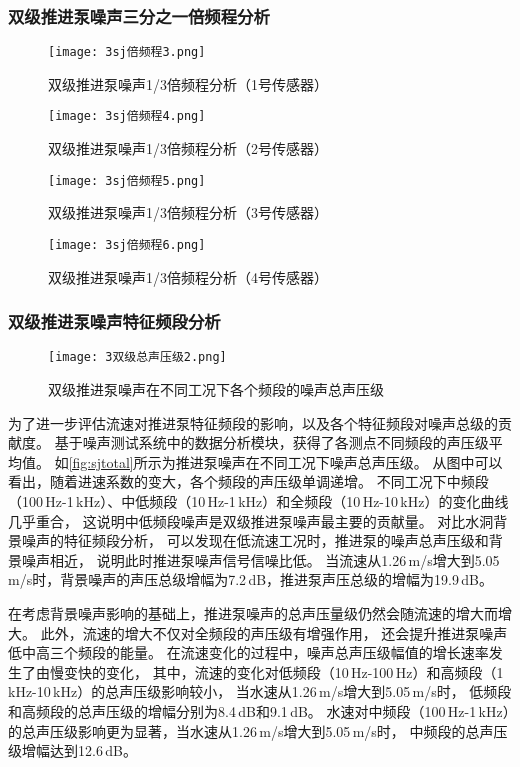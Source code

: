 \subsubsection{双级推进泵噪声三分之一倍频程分析}
\begin{figure}[htbp]
    \centering
    \texttt{[image: 3sj倍频程3.png]}
    \caption{\label{fig:sjotc1}双级推进泵噪声1/3倍频程分析（1号传感器）}
\end{figure}
\begin{figure}[htbp]
    \centering
    \texttt{[image: 3sj倍频程4.png]}
    \caption{\label{fig:sjotc2}双级推进泵噪声1/3倍频程分析（2号传感器）}
\end{figure}
\begin{figure}[htbp]
    \centering
    \texttt{[image: 3sj倍频程5.png]}
    \caption{\label{fig:sjotc3}双级推进泵噪声1/3倍频程分析（3号传感器）}
\end{figure}
\begin{figure}[htbp]
    \centering
    \texttt{[image: 3sj倍频程6.png]}
    \caption{\label{fig:sjotc4}双级推进泵噪声1/3倍频程分析（4号传感器）}
\end{figure}
\subsubsection{双级推进泵噪声特征频段分析}
\begin{figure}[htbp]
    \centering
    \texttt{[image: 3双级总声压级2.png]}
    \caption{\label{fig:sjtotal}双级推进泵噪声在不同工况下各个频段的噪声总声压级}
\end{figure}

为了进一步评估流速对推进泵特征频段的影响，以及各个特征频段对噪声总级的贡献度。
基于噪声测试系统中的数据分析模块，获得了各测点不同频段的声压级平均值。
如\autoref{fig:sjtotal}所示为推进泵噪声在不同工况下噪声总声压级。
从图中可以看出，随着进速系数的变大，各个频段的声压级单调递增。
不同工况下中频段（100\,Hz-1\,kHz）、中低频段（10\,Hz-1\,kHz）和全频段（10\,Hz-10\,kHz）的变化曲线几乎重合，
这说明中低频段噪声是双级推进泵噪声最主要的贡献量。
对比水洞背景噪声的特征频段分析，
可以发现在低流速工况时，推进泵的噪声总声压级和背景噪声相近，
说明此时推进泵噪声信号信噪比低。
当流速从1.26\,m/s增大到5.05\,m/s时，背景噪声的声压总级增幅为7.2\,dB，推进泵声压总级的增幅为19.9\,dB。

在考虑背景噪声影响的基础上，推进泵噪声的总声压量级仍然会随流速的增大而增大。
此外，流速的增大不仅对全频段的声压级有增强作用，
还会提升推进泵噪声低中高三个频段的能量。
在流速变化的过程中，噪声总声压级幅值的增长速率发生了由慢变快的变化，
其中，流速的变化对低频段（10\,Hz-100\,Hz）和高频段（1\,kHz-10\,kHz）的总声压级影响较小，
当水速从1.26\,m/s增大到5.05\,m/s时，
低频段和高频段的总声压级的增幅分别为8.4\,dB和9.1\,dB。
水速对中频段（100\,Hz-1\,kHz）的总声压级影响更为显著，当水速从1.26\,m/s增大到5.05\,m/s时，
中频段的总声压级增幅达到12.6\,dB。
